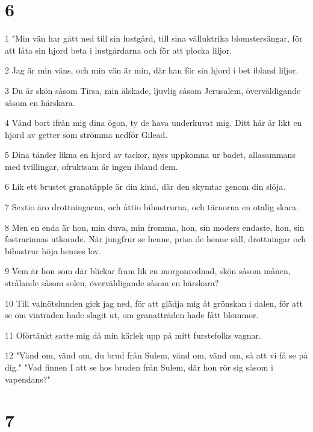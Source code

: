 \chapter{6}

\par 1 "Min vän har gått ned till sin lustgård, till sina välluktrika blomstersängar, för att låta sin hjord beta i lustgårdarna och för att plocka liljor.
\par 2 Jag är min väns, och min vän är min, där han för sin hjord i bet ibland liljor.
\par 3 Du är skön såsom Tirsa, min älskade, ljuvlig såsom Jerusalem, överväldigande såsom en härskara.
\par 4 Vänd bort ifrån mig dina ögon, ty de hava underkuvat mig. Ditt hår är likt en hjord av getter som strömma nedför Gilead.
\par 5 Dina tänder likna en hjord av tackor, nyss uppkomna ur badet, allasammans med tvillingar, ofruktsam är ingen ibland dem.
\par 6 Lik ett brustet granatäpple är din kind, där den skymtar genom din slöja.
\par 7 Sextio äro drottningarna, och åttio bihustrurna, och tärnorna en otalig skara.
\par 8 Men en enda är hon, min duva, min fromma, hon, sin moders endaste, hon, sin fostrarinnas utkorade. När jungfrur se henne, prisa de henne säll, drottningar och bihustrur höja hennes lov.
\par 9 Vem är hon som där blickar fram lik en morgonrodnad, skön såsom månen, strålande såsom solen, överväldigande såsom en härskara?
\par 10 Till valnötslunden gick jag ned, för att glädja mig åt grönskan i dalen, för att se om vinträden hade slagit ut, om granatträden hade fått blommor.
\par 11 Oförtänkt satte mig då min kärlek upp på mitt furstefolks vagnar.
\par 12 "Vänd om, vänd om, du brud från Sulem, vänd om, vänd om, så att vi få se på dig." "Vad finnen I att se hos bruden från Sulem, där hon rör sig såsom i vapendans?"

\chapter{7}

